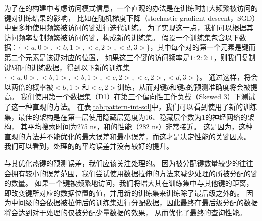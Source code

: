 为了在{\li}的构建中考虑访问模式信息，一个直观的办法是在训练时加大频繁被访问的键对训练结果的影响，
比如在随机梯度下降（stochastic gradient descent，SGD）中更多地使用频繁被访问的键进行迭代训练。
为了实现这一点，我们可以根据其访问频率复制频繁被访问的键，构成新的训练集。
假设一个训练集包含以下数据：$\{<a, 0>, <b, 1>, <c, 2>, <d, 3>\}$，其中每个对的第一个元素是键而第二个元素是该键对应的位置，
如果这三个键的访问频率是$1:2:2:1$，则我们复制键$b$和$c$的训练数据，得到以下新的训练集$\{<a, 0>, <b, 1>, <b, 1>, <c, 2>, <c, 2>, <d, 3>\}$。
通过这样，{\model}将会以两倍的概率被$<b, 1>$和$<c, 2>$训练，从而对键$b$和键$c$的预测准确度将会被提高。
我们使用第一个数据集（D1）在第三个偏向性工作负载（Skewed 3）下测试了这一种直观的方法。
在表\ref{tab:pattern-int-sol}中，我们可以看到使用了新的训练集，最佳的{\li}架构是在第一层使用隐藏层宽度为16、隐藏层个数为1的神经网络的{\li}架构，
其平均搜索时间为275 ns，和{\li}的性能（282 ns）非常接近。
这是因为，这种直观的方法并不能优化{\model}的最大误差和最小误差，而这才是决定{\li}性能的关键因素。
我们可以看到，处理{\hotkey}的{\model}的平均误差并没有较好的提升。


与其优化热键的预测误差，我们应该关注处理{\hotkey}的{\model}。
因为被分配键数量较少的{\model}往往会拥有较小的误差范围，我们尝试使用数据拉伸的方法来减少处理{\hotkey}的{\model}所被分配的键的数量。
如果一个键被频繁地访问，我们将增大其在训练集中与其他键的距离，即改变键所对应的数据位置的值，并用新的训练集来训练除了最后级之外的{\model}。
因为中间级的{\model}会依据被拉伸后的训练集进行分配数据，因此最终在最后级分配的数据将会达到对于处理{\hotkey}的{\model}仅被分配少量数据的效果，
从而优化了最终{\hotkey}的查询性能。

